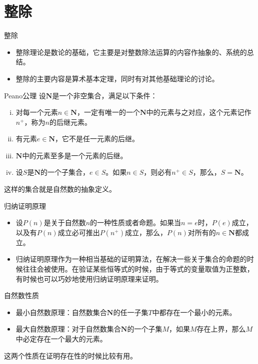 \documentclass[dvipdfmx]{beamer}
\newcommand{\N}{\boldsymbol{N}}
\begin{document}
\section{整除}

\begin{frame}{整除}
\begin{itemize}
\item 整除理论是数论的基础，它主要是对整数除法运算的内容作抽象的、系统的总结。
\item 整除的主要内容是算术基本定理，同时有对其他基础理论的讨论。
\end{itemize}
\end{frame}

\begin{frame}{Peano公理}
设$\N$是一个非空集合，满足以下条件：
\pause
\begin{enumerate}[(i)]
\item 对每一个元素$n\in \N$，一定有唯一的一个$\N$中的元素与之对应，这个元素记作$n^+$，称为$n$的后继元素。
\item 有元素$e\in \N$，它不是任一元素的后继。
\item $\N$中的元素至多是一个元素的后继。
\item 设$S$是$\N$的一个子集合，$e\in S$。如果$n\in S$，则必有$n^+\in S$，那么，$S=\N$。
\end{enumerate}
\pause
这样的集合就是自然数的抽象定义。
\end{frame}

\begin{frame}{归纳证明原理}
\begin{itemize}
\item 设$P(n)$是关于自然数$n$的一种性质或者命题。如果当$n=e$时，$P(e)$成立，以及有$P(n)$成立必可推出$P(n^+)$成立，那么，$P(n)$对所有的$n\in \N$都成立。
\pause
\item 归纳证明原理作为一种相当基础的证明算法，在解决一些关于集合的命题的时候往往会被使用。在验证某些恒等式的时候，由于等式的变量取值为正整数，有时候也可以巧妙地使用归纳证明原理来证明。
\end{itemize}
\end{frame}

\begin{frame}{自然数性质}
\begin{itemize}
\item 最小自然数原理：自然数集合$\N$的任一子集$T$中都存在一个最小的元素。
\item 最大自然数原理：对于自然数集合$\N$的一个子集$M$，如果$M$存在上界，那么$M$中必定存在一个最大的元素。
\end{itemize}
这两个性质在证明存在性的时候比较有用。
\end{frame}
\end{document}
